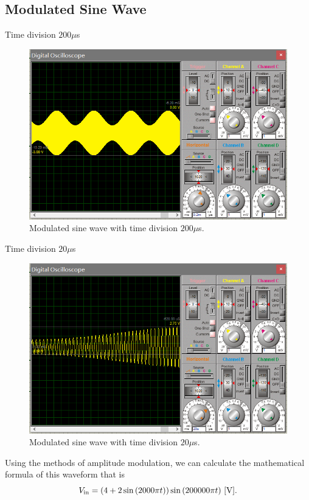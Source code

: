 \documentclass[a4paper]{article}
\begin{document}
\subsection{Modulated Sine Wave}
Time division $200\mu$s 
\begin{figure}[H]
	\centering
	\includegraphics[width=0.8\linewidth]{16.png}
	\caption{Modulated sine wave with time division $200\mu$s.}
\end{figure}
Time division $20\mu$s
\begin{figure}[H]
	\centering
	\includegraphics[width=0.8\linewidth]{17.png}
	\caption{Modulated sine wave with time division $20\mu$s.}
\end{figure}
Using the methods of amplitude modulation, we can calculate the mathematical formula of this waveform that is
$$V_\text{in}=(4+2\sin{(2000\pi t)})\sin{(200000\pi t)}\ \rm{[V]}.$$
\end{document}
